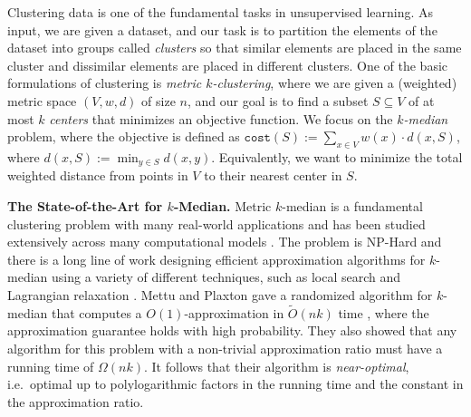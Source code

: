 \documentclass[11pt]{article}
\newcommand{\1}{\mathmybb{1}}
\newcommand{\cl}{\texttt{cost}}
\begin{document}
Clustering data is one of the fundamental tasks in unsupervised learning. As input, we are given a dataset, and our task is to partition the elements of the dataset into groups called \emph{clusters} so that similar elements are placed in the same cluster and dissimilar elements are placed in different clusters. One of the basic formulations of clustering is \emph{metric $k$-clustering}, where we are given a (weighted) metric space $(V,w,d)$ of size $n$, and our goal is to find a subset $S \subseteq V$ of at most $k$ \emph{centers} that minimizes an objective function.
We focus on the \emph{$k$-median} problem, where the objective is defined as $\cl(S) := \sum_{x \in V} w(x) \cdot d(x, S)$, where $d(x, S) := \min_{y \in S} d(x,y)$.
Equivalently, we want to minimize the total weighted distance from points in $V$ to their nearest center in $S$.

\medskip
\noindent \textbf{The State-of-the-Art for $k$-Median.} Metric $k$-median is a fundamental clustering problem with many real-world applications and has been studied extensively across many computational models 
\cite{charikar1999constant,jain2001approximation,ahmadian2019better,byrka2017improved,charikar2003better, ailon2009streaming}. The problem is NP-Hard and there is a long line of work designing efficient approximation algorithms for $k$-median using a variety of different techniques, such as local search \cite{AryaGKMMP04} and Lagrangian relaxation \cite{jain2001approximation}.
Mettu and Plaxton gave a randomized algorithm for $k$-median that computes a $O(1)$-approximation in $\tilde O(nk)$ time \cite{MettuP02}, where the approximation guarantee holds with high probability. 
They also showed that any algorithm for this problem with a non-trivial approximation ratio must have a running time of $\Omega (nk)$.
It follows that their algorithm is \emph{near-optimal}, i.e.~optimal up to polylogarithmic factors in the running time and the constant in the approximation ratio.
\end{document}
